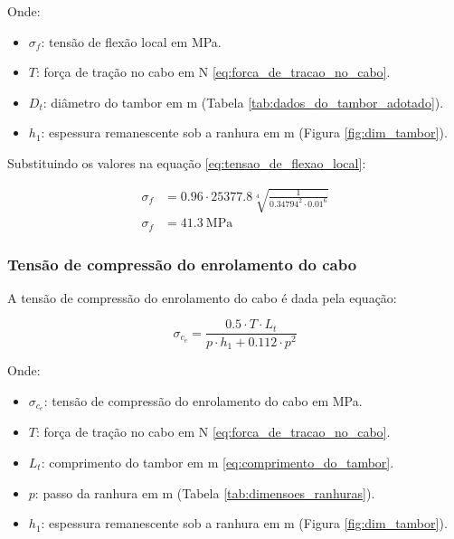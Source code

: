 Onde:

\begin{itemize}
  \item $\sigma_f$: tensão de flexão local em \si{\mega\pascal}.
  \item $T$: força de tração no cabo em \si{\newton} \eqref{eq:forca_de_tracao_no_cabo}.
  \item $D_t$: diâmetro do tambor em \si{\meter} (Tabela \ref{tab:dados_do_tambor_adotado}).
  \item $h_1$: espessura remanescente sob a ranhura em \si{\meter} (Figura \ref{fig:dim_tambor}).
\end{itemize}

\vspace{1em}

Substituindo os valores na equação \eqref{eq:tensao_de_flexao_local}:

\begin{align*}
  \sigma_f & = \num{0.96} \cdot \num{25377.8} \sqrt[4]{\frac{1}{\num{0.34794}^2 \cdot \num{0.01}^6}} \\
  \sigma_f & = \boxed{\SI{41.3}{\mega\pascal}}
\end{align*}

\subsubsection{Tensão de compressão do enrolamento do cabo}

A tensão de compressão do enrolamento do cabo é dada pela equação:

\begin{equation}
  \sigma_{c_e} = \frac{\num{0.5} \cdot T \cdot L_t}{p \cdot h_1 + \num{0.112} \cdot p^2}
  \label{eq:tensao_de_compressao_do_enrolamento_do_cabo}
\end{equation}

Onde:

\begin{itemize}
  \item $\sigma_{c_e}$: tensão de compressão do enrolamento do cabo em \si{\mega\pascal}.
  \item $T$: força de tração no cabo em \si{\newton} \eqref{eq:forca_de_tracao_no_cabo}.
  \item $L_t$: comprimento do tambor em \si{\meter} \eqref{eq:comprimento_do_tambor}.
  \item $p$: passo da ranhura em \si{\meter} (Tabela \ref{tab:dimensoes_ranhuras}).
  \item $h_1$: espessura remanescente sob a ranhura em \si{\meter} (Figura \ref{fig:dim_tambor}).
\end{itemize}

